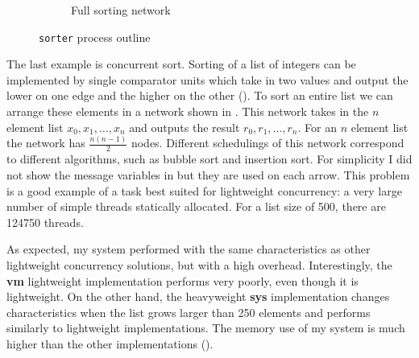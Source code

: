 \documentclass[12pt,twoside,notitlepage]{report}
\theoremstyle{plain}%
\theoremstyle{definition}
\theoremstyle{remark}
\begin{document}
\begin{figure}[H]
\begin{subfigure}[b]{0.45\linewidth}
\caption{Full sorting network}
\label{fig:sorter_process_full}
\end{subfigure}
\cprotect\caption{\verb|sorter| process outline}
\label{fig:sorter_process_outline}
\end{figure}


The last example is concurrent sort. Sorting of a list of integers can be implemented by single comparator units which take in two values and output the lower on one edge and the higher on the other (). To sort an entire list we can arrange these elements in a network shown in . This network takes in the $ n $ element list $ x_0, x_1, \dots, x_n $ and outputs the result $ r_0, r_1, \dots, r_n $. For an $ n $ element list the network has $ \frac{n(n-1)}{2} $ nodes. Different schedulings of this network correspond to different algorithms, such as bubble sort and insertion sort. For simplicity I did not show the message variables in  but they are used on each arrow. This problem is a good example of a task best suited for lightweight concurrency: a very large number of simple threads statically allocated. For a list size of 500, there are 124750 threads. 


As expected, my system performed with the same characteristics as other lightweight concurrency solutions, but with a high overhead. Interestingly, the \textbf{vm} lightweight implementation performs very poorly, even though it is lightweight. On the other hand, the heavyweight \textbf{sys} implementation changes characteristics when the list grows larger than 250 elements and performs similarly to lightweight implementations. The memory use of my system is much higher than the other implementations ().
\end{document}
